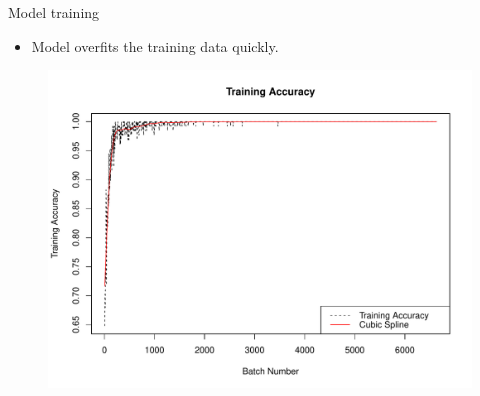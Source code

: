 \documentclass{beamer}
\begin{document}
\begin{frame}{Model training}
\begin{itemize}
\item Model overfits the training data quickly.
\end{itemize}
\begin{figure}
\centering
\includegraphics[width=0.83\linewidth]{../Thesis_Docs/Images/7_train_acc5.pdf}
\end{figure}
\end{frame}
\end{document}
